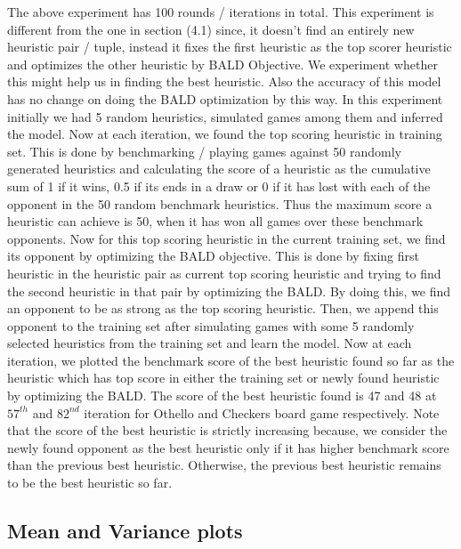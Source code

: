 \documentclass{scrartcl}
\begin{document}
{The above experiment has 100 rounds / iterations in total. This experiment is different from the one in section (4.1) since, it doesn't find an entirely new heuristic pair / tuple, instead it fixes the first heuristic as the top scorer heuristic and optimizes the other heuristic by BALD Objective. We experiment whether this might help us in finding the best heuristic. Also the accuracy of this model has no change on doing the BALD optimization by this way. In this experiment initially we had 5 random heuristics, simulated games among them and inferred the model. Now at each iteration, we found the top scoring heuristic in training set. This is done by benchmarking / playing games against 50 randomly generated heuristics and calculating the score of a heuristic as the cumulative sum of 1 if it wins, 0.5 if its ends in a draw or 0 if it has lost with each of the opponent in the 50 random benchmark heuristics. Thus the maximum score a heuristic can achieve is 50, when it has won all games over these benchmark opponents. Now for this top scoring heuristic in the current training set, we find its opponent by optimizing the BALD objective. This is done by fixing first heuristic in the heuristic pair as current top scoring heuristic and trying to find the second heuristic in that pair by optimizing the BALD. By doing this, we find an opponent to be as strong as the top scoring heuristic. Then, we append this opponent to the training set after simulating games with some 5 randomly selected heuristics from the training set and learn the model. Now at each iteration, we plotted the benchmark score of the best heuristic found so far as the heuristic which has top score in either the training set or newly found heuristic by optimizing the BALD. The score of the best heuristic found is 47 and 48 at  $57^{th}$ and $82^{nd}$ iteration for Othello and Checkers board game respectively. Note that the score of the best heuristic is strictly increasing because, we consider the newly found opponent as the best heuristic only if it has higher benchmark score than the previous best heuristic. Otherwise, the previous best heuristic remains to be the best heuristic so far. 



\subsection {Mean and Variance plots}

\begin{figure}[H]


\end{figure}}
\end{document}
